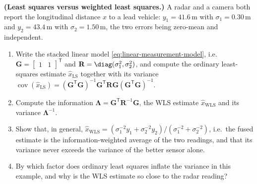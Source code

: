 \begin{prob}\label{prob:ch03:1}
\textbf{(Least squares versus weighted least squares.)} A radar and a camera both report the longitudinal distance $x$ to a lead vehicle: $y_1=41.6$\,m with $\sigma_1=0.30$\,m and $y_2=43.4$\,m with $\sigma_2=1.50$\,m, the two errors being zero-mean and independent.
\begin{enumerate}
\item[(a)] Write the stacked linear model \eqref{eq:linear-measurement-model}, i.e.\ $\mathbf{G}=\begin{bmatrix}1&1\end{bmatrix}^{\mathsf T}$ and $\mathbf{R}=\diag(\sigma_1^{2},\sigma_2^{2})$, and compute the ordinary least-squares estimate $\widehat{x}_{\mathrm{LS}}$ together with its variance $\operatorname{cov}(\widehat{x}_{\mathrm{LS}})=(\mathbf{G}^{\mathsf T}\mathbf{G})^{-1}\mathbf{G}^{\mathsf T}\mathbf{R}\mathbf{G}(\mathbf{G}^{\mathsf T}\mathbf{G})^{-1}$.
\item[(b)] Compute the information $\mathbf{\Lambda}=\mathbf{G}^{\mathsf T}\mathbf{R}^{-1}\mathbf{G}$, the WLS estimate $\widehat{x}_{\mathrm{WLS}}$ and its variance $\mathbf{\Lambda}^{-1}$.
\item[(c)] Show that, in general, $\widehat{x}_{\mathrm{WLS}}=(\sigma_1^{-2}y_1+\sigma_2^{-2}y_2)/(\sigma_1^{-2}+\sigma_2^{-2})$, i.e.\ the fused estimate is the information-weighted average of the two readings, and that its variance never exceeds the variance of the better sensor alone.
\item[(d)] By which factor does ordinary least squares inflate the variance in this example, and why is the WLS estimate so close to the radar reading?
\end{enumerate}
\end{prob}

